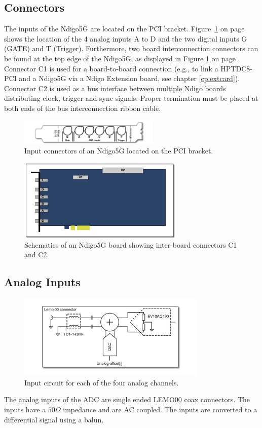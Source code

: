 \subsection{Connectors}
%
The inputs of the Ndigo5G are located on the PCI bracket. Figure~\ref{fig:schematics} on page~\pageref{fig:schematics} shows the location of the 4 analog inputs A to D and the two digital inputs G (GATE) and T (Trigger). Furthermore, two board interconnection connectors can be found at the top edge of the Ndigo5G, as displayed in  Figure \ref{fig:schematics} on page \pageref{fig:schematics}. Connector C1 is used for a board-to-board connection (e.g., to link a HPTDC8-PCI and a Ndigo5G via a Ndigo Extension board, see chapter \ref{cp:extcard}). Connector C2 is used as a bus interface between multiple Ndigo boards distributing clock, trigger and sync signals. Proper termination must be placed at both ends of the bus interconnection ribbon cable.
%
\begin{figure}[hb]
    \centering
    \includegraphics[width=0.6\textwidth]{figures/Ndigo-Slotblende.pdf}
    \caption{Input connectors of an Ndigo5G located on the PCI bracket.}
\end{figure}
%
\begin{figure}[ht]
    \centering
    \includegraphics[width=0.7\textwidth]{figures/Ndigo_schematic.pdf}
    \caption{Schematics of an Ndigo5G board showing inter-board connectors C1 and C2.\label{fig:schematics}}
\end{figure}
%
%
%
\subsection{Analog Inputs}
%
\begin{figure}[ht]
    \centering
    \includegraphics[width=0.8\textwidth]{figures/InputCircuit.pdf}
    \caption{Input circuit for each of the four analog channels.}
\end{figure}
%
The analog inputs of the ADC are single ended LEMO00 coax connectors. The inputs have a $50\Omega$ impedance and are AC coupled. The inputs are converted to a differential signal using a balun.
%
%
%

